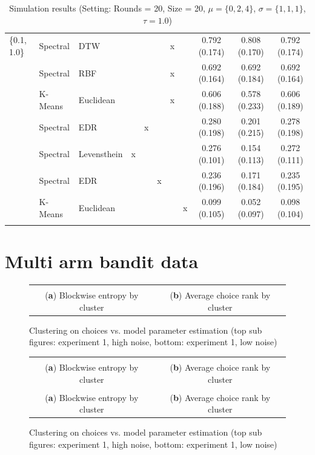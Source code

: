 \documentclass[12pt,a4paper,bibliography=totocnumbered,listof=totocnumbered]{scrartcl}
\begin{document}
{\begin{appendix}
\begin{table}[H]
\begin{tabularx}{\textwidth}{ lllcccccccc}
\{0.1, 1.0\} & Spectral  & DTW &  &  &  & x &  & 0.792 (0.174) & 0.808 (0.170) & 0.792 (0.174) \\ 
& Spectral  & RBF &  &  &  & x &  & 0.692 (0.164) & 0.692 (0.184) & 0.692 (0.164) \\ 
& K-Means & Euclidean  &  &  &  & x &  & 0.606 (0.188) & 0.578 (0.233) & 0.606 (0.189) \\ 
& Spectral  & EDR &  & x &  &  &  & 0.280 (0.198) & 0.201 (0.215) & 0.278 (0.198) \\ 
& Spectral  & Levensthein & x &  &  &  &  & 0.276 (0.101) & 0.154 (0.113) & 0.272 (0.111) \\ 
& Spectral  & EDR &  &  & x &  &  & 0.236 (0.196) & 0.171 (0.184) & 0.235 (0.195) \\ 
& K-Means & Euclidean  &  &  &  &  & x & 0.099 (0.105) & 0.052 (0.097) & 0.098 (0.104) \\ 
\hline \\[-1.8ex] 
	\end{tabularx} 
	\caption{Simulation results (Setting: Rounds = 20, Size = 20, $\mu = \{0,2,4\}$, $\sigma =  \{1,1,1\}$, $\tau = 1.0$)} 
		\label{tab:apstab8}
\end{table} 

\section{Multi arm bandit data}

\begin{figure}[H]
	\centering
	\small
	\hspace*{-0.7in}
	\begin{tabular}{cc}
		 &  \\
		(\textbf{a}) Blockwise entropy by cluster & (\textbf{b}) Average choice rank by cluster 
	\end{tabular} \quad
	\caption{Clustering on choices vs. model parameter estimation (top sub figures: experiment 1, high noise, bottom: experiment 1, low noise)}
	\label{fig:cluse1c4}
\end{figure}

\begin{figure}[H]
	\centering
	\small
	\hspace*{-0.7in}
	\begin{tabular}{cc}
			 &  \\
				(\textbf{a}) Blockwise entropy by cluster & (\textbf{b}) Average choice rank by cluster \\
			 &  \\
				(\textbf{a}) Blockwise entropy by cluster & (\textbf{b}) Average choice rank by cluster \\
		\end{tabular} \quad
		\caption{Clustering on choices vs. model parameter estimation (top sub figures: experiment 1, high noise, bottom: experiment 1, low noise)}
		\label{fig:cluse1c3}
\end{figure}



\end{appendix}}
\end{document}
